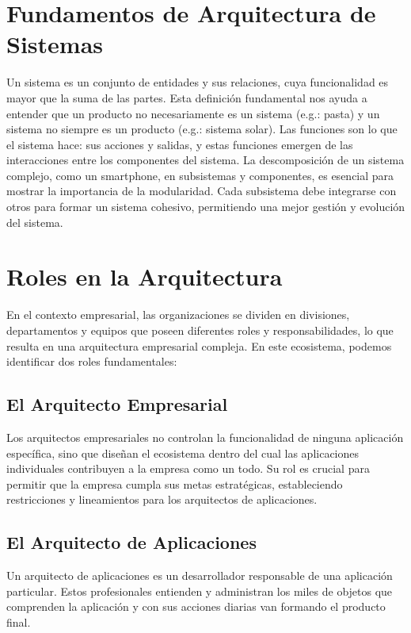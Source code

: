 \section{Fundamentos de Arquitectura de Sistemas}

Un sistema es un conjunto de entidades y sus relaciones, cuya funcionalidad es mayor que la suma de las partes. Esta definición fundamental nos ayuda a entender que un producto no necesariamente es un sistema (e.g.: pasta) y un sistema no siempre es un producto (e.g.: sistema solar). Las funciones son lo que el sistema hace: sus acciones y salidas, y estas funciones emergen de las interacciones entre los componentes del sistema. La descomposición de un sistema complejo, como un smartphone, en subsistemas y componentes, es esencial para mostrar la importancia de la modularidad. Cada subsistema debe integrarse con otros para formar un sistema cohesivo, permitiendo una mejor gestión y evolución del sistema.

\section{Roles en la Arquitectura}

En el contexto empresarial, las organizaciones se dividen en divisiones, departamentos y equipos que poseen diferentes roles y responsabilidades, lo que resulta en una arquitectura empresarial compleja. En este ecosistema, podemos identificar dos roles fundamentales:

\subsection{El Arquitecto Empresarial}
Los arquitectos empresariales no controlan la funcionalidad de ninguna aplicación específica, sino que diseñan el ecosistema dentro del cual las aplicaciones individuales contribuyen a la empresa como un todo. Su rol es crucial para permitir que la empresa cumpla sus metas estratégicas, estableciendo restricciones y lineamientos para los arquitectos de aplicaciones.

\subsection{El Arquitecto de Aplicaciones}
Un arquitecto de aplicaciones es un desarrollador responsable de una aplicación particular. Estos profesionales entienden y administran los miles de objetos que comprenden la aplicación y con sus acciones diarias van formando el producto final.

